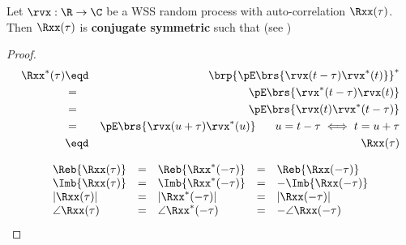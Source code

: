 \begin{theorem}
Let $\rvx:\R\to\C$ be a WSS random process with
auto-correlation $\Rxx(\tau)$.
Then $\Rxx(\tau)$ is \textbf{conjugate symmetric} such that
(see )
\end{theorem}
\begin{proof}
\begin{eqnarray*}
   \Rxx^\ast(\tau)
     &\eqd& \brp{ \pE\brs{\rvx(t-\tau)\rvx^\ast(t)}}^\ast
   \\&=&           \pE\brs{\rvx^\ast(t-\tau)\rvx(t)}
   \\&=&           \pE\brs{\rvx(t)\rvx^\ast(t-\tau)}
   \\&=&           \pE\brs{\rvx(u+\tau)\rvx^\ast(u)}
       \hspace{4ex}u=t-\tau \iff t=u+\tau
   \\&\eqd&        \Rxx(\tau)
\end{eqnarray*}

\[\begin{array}{*{10}{l}}
   \Reb{\Rxx(\tau)}
     &=& \Reb{\Rxx^\ast(-\tau)}
     &=& \Reb{\Rxx(-\tau)}
\\
   \Imb{\Rxx(\tau)}
     &=& \Imb{\Rxx^\ast(-\tau)}
     &=& -\Imb{\Rxx(-\tau)}
\\
   |\Rxx(\tau)|
     &=& |\Rxx^\ast(-\tau)|
     &=& |\Rxx(-\tau)|
\\
   \angle\Rxx(\tau)
     &=& \angle\Rxx^\ast(-\tau)
     &=& -\angle\Rxx(-\tau)
\end{array}\]

\end{proof}


